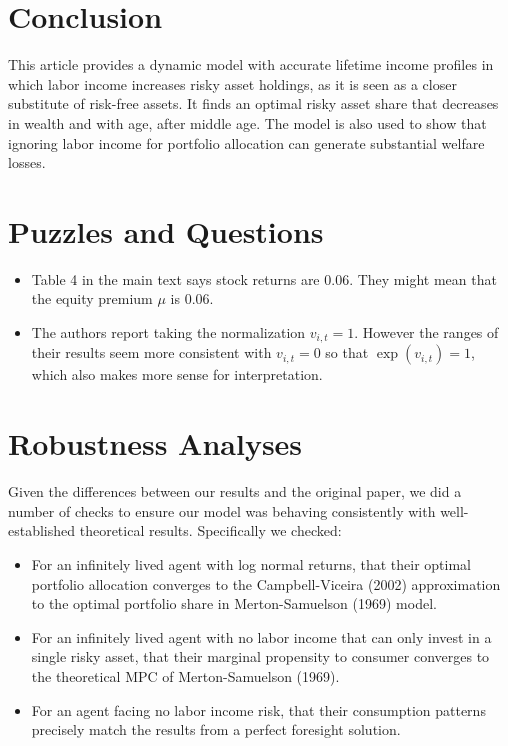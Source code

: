 \documentclass[./CGMPortfolio.tex]{subfiles}
\begin{document}
\hypertarget{Conclusion}{}
\section{Conclusion}

This article provides a dynamic model with accurate lifetime income profiles in which labor income increases risky asset holdings, as it is seen as a closer substitute of risk-free assets. It finds an optimal risky asset share that decreases in wealth and with age, after middle age. The model is also used to show that ignoring labor income for portfolio allocation can generate substantial welfare losses.

\hypertarget{Puzzles-and-Questions}{}
\section{Puzzles and Questions}\label{sec:Puzzles}
\begin{itemize}
	\item Table 4 in the main text says stock returns are $0.06$. They might 
	mean that the equity premium $\mu$ is $0.06$.
	\item The authors report taking the normalization $v_{i,t} = 1$. However the ranges of their results seem more consistent with $v_{i,t} = 0$ so that $\exp (v_{i,t}) = 1$, which also makes more sense for interpretation.
\end{itemize}

\hypertarget{Robustness Analyses}{}
\section{Robustness Analyses}

Given the differences between our results and the original paper, we did a number of checks to ensure our model was behaving consistently with well-established theoretical results. Specifically we checked:
\begin{itemize}
	\item For an infinitely lived agent with log normal returns, that their optimal portfolio allocation converges to the Campbell-Viceira (2002) approximation to the optimal portfolio share in Merton-Samuelson (1969) model.
	\item For an infinitely lived agent with no labor income that can only invest in a single risky asset, that their marginal propensity to consumer converges to the theoretical MPC of Merton-Samuelson (1969).
	\item For an agent facing no labor income risk, that their consumption patterns precisely match the results from a perfect foresight solution.
\end{itemize}
\end{document}

